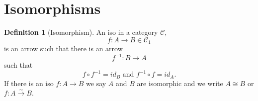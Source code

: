 \documentclass[fleqn]{scrartcl}
\newcommand{\cat}[1]{\mathcal{#1}}
\theoremstyle{definition} \newtheorem{definition}{Definition}
\theoremstyle{remark} \newtheorem{example}{Example}
\begin{document}
\section{Isomorphisms}
\begin{definition}[Isomorphism]
An iso in a category $\cat{C}$,
\[ f: A \to B \in \cat{C}_1 \]
is an arrow such that there is an arrow
\[ f^{-1} : B \to A \]
such that 
\[ f \circ f^{-1} = id_B \textrm{ and } f^{-1} \circ f = id_A. \]
If there is an iso $f : A \to B$ we say $A$ and $B$ are isomorphic and
we write $A \cong B$ or $f : A \stackrel{\sim}{\to} B$.
\end{definition}
\end{document}
